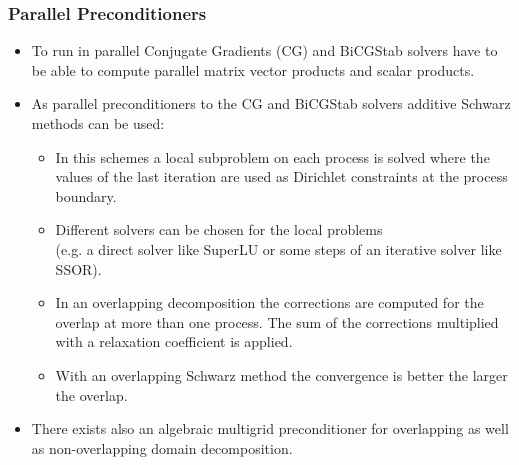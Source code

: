 \documentclass[aspectratio=169,11pt]{beamer}
\theoremstyle{definition}
\begin{document}
\begin{frame}
\frametitle{Parallel Preconditioners}
\begin{itemize}
\item To run in parallel Conjugate Gradients (CG) and BiCGStab solvers have to be able to compute parallel matrix vector
products and scalar products.
\item As parallel preconditioners to the CG and BiCGStab solvers additive Schwarz methods can be used:
\begin{itemize}
\item In this schemes a local subproblem on each process is solved
where the values of the last iteration are used as Dirichlet constraints at the process boundary.
\item Different solvers can be chosen for the local problems\\ (e.g. a direct solver like SuperLU or some steps of an
iterative solver like SSOR).
\item In an overlapping decomposition the corrections are computed for the overlap at more than one process. The sum of the corrections multiplied with a relaxation
coefficient is applied.
\item With an overlapping Schwarz method the convergence is better the larger the overlap.
\end{itemize}
\item There exists also an algebraic multigrid preconditioner for overlapping as well as non-overlapping domain decomposition.
\end{itemize}
\end{frame}
\end{document}
